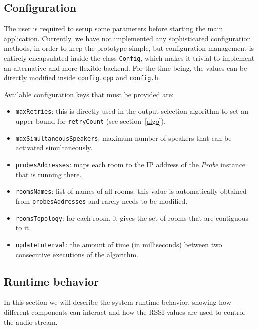 \documentclass[conference]{IEEEtran}
\newcommand{\Probe}{\textsl{Probe}}
\begin{document}
\subsection{Configuration}
The user is required to setup some parameters before starting the main application. Currently, we have not implemented any sophisticated configuration methods, in order to keep the prototype simple, but configuration management is entirely encapsulated inside the class \texttt{Config}, which makes it trivial to implement an alternative and more flexible backend. For the time being, the values can be directly modified inside \texttt{config.cpp} and \texttt{config.h}.

Available configuration keys that must be provided are:
\begin{itemize}
\item \texttt{maxRetries}: this is directly used in the output selection algorithm to set an upper bound for \texttt{retryCount} (see section~\ref{algo}).
\item \texttt{maxSimultaneousSpeakers}: maximum number of speakers that can be activated simultaneously.
\item \texttt{probesAddresses}: maps each room to the IP address of the \Probe{} instance that is running there.
\item \texttt{roomsNames}: list of names of all rooms; this value is automatically obtained from \texttt{probesAddresses} and rarely needs to be modified.
\item \texttt{roomsTopology}: for each room, it gives the set of rooms that are contiguous to it.
\item \texttt{updateInterval}: the amount of time (in milliseconds) between two consecutive executions of the algorithm.
\end{itemize}

\subsection{Runtime behavior}
In this section we will describe the system runtime behavior, showing how different components can interact and how the RSSI values are used to control the audio stream.
\end{document}
